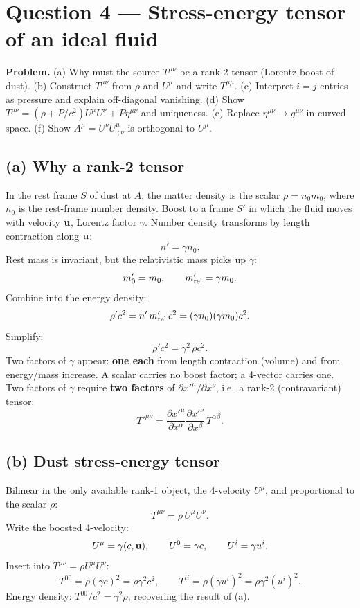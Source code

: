 \documentclass[11pt]{article}
\newcommand{\pd}[2]{\frac{\partial #1}{\partial #2}}
\begin{document}
\section*{Question 4 --- Stress-energy tensor of an ideal fluid}

\textbf{Problem.} (a) Why must the source $T^{\mu\nu}$ be a rank-2 tensor (Lorentz boost of dust). (b) Construct $T^{\mu\nu}$ from $\rho$ and $U^\mu$ and write $T^{\mu\mu}$. (c) Interpret $i=j$ entries as pressure and explain off-diagonal vanishing. (d) Show $T^{\mu\nu} = (\rho + P/c^2)U^\mu U^\nu + P\eta^{\mu\nu}$ and uniqueness. (e) Replace $\eta^{\mu\nu}\to g^{\mu\nu}$ in curved space. (f) Show $A^\mu = U^\nu U^\mu_{\;;\nu}$ is orthogonal to $U^\mu$.

\subsection*{(a) Why a rank-2 tensor}

In the rest frame $S$ of dust at $A$, the matter density is the scalar $\rho = n_0 m_0$, where $n_0$ is the rest-frame number density. Boost to a frame $S'$ in which the fluid moves with velocity $\vb u$, Lorentz factor $\gamma$. Number density transforms by length contraction along $\vb u$:
\[ n' = \gamma n_0. \]
Rest mass is invariant, but the relativistic mass picks up $\gamma$:
\[ m_0' = m_0,\qquad m'_{\rm rel} = \gamma m_0. \]
Combine into the energy density:
\[ \rho' c^2 = n'\,m'_{\rm rel}\,c^2 = (\gamma n_0)(\gamma m_0)c^2. \]
Simplify:
\[ \rho' c^2 = \gamma^2\,\rho c^2. \]
Two factors of $\gamma$ appear: \textbf{one each} from length contraction (volume) and from energy/mass increase. A scalar carries no boost factor; a 4-vector carries one. Two factors of $\gamma$ require \textbf{two factors} of $\partial x'^\mu/\partial x^\nu$, i.e.\ a rank-2 (contravariant) tensor:
\[ \boxed{\;T'^{\mu\nu} = \pd{x'^\mu}{x^\alpha}\pd{x'^\nu}{x^\beta}\,T^{\alpha\beta}.\;} \]

\subsection*{(b) Dust stress-energy tensor}

Bilinear in the only available rank-1 object, the 4-velocity $U^\mu$, and proportional to the scalar $\rho$:
\begin{equation}
\boxed{\;T^{\mu\nu} = \rho\,U^\mu U^\nu.\;}
\label{eq:dust-T}
\end{equation}
Write the boosted 4-velocity:
\[ U^\mu = \gamma(c,\vb u),\qquad U^0 = \gamma c,\qquad U^i = \gamma u^i. \]
Insert into $T^{\mu\nu} = \rho U^\mu U^\nu$:
\[ T^{00} = \rho(\gamma c)^2 = \rho\gamma^2 c^2,\qquad T^{ii} = \rho(\gamma u^i)^2 = \rho\gamma^2 (u^i)^2. \]
Energy density: $T^{00}/c^2 = \gamma^2\rho$, recovering the result of (a).
\end{document}

